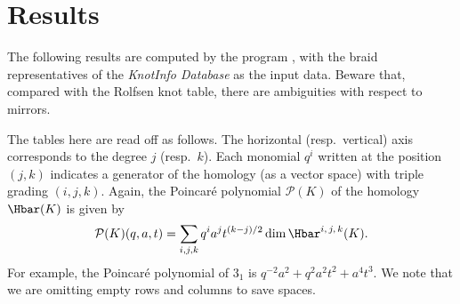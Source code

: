 
\appendix
\section{Results}\label{sec:results}

The following results are computed by the program \cite{kr-calc}, with the braid representatives of the \textit{KnotInfo Database} \cite{knotinfo} as the input data. Beware that, compared with the Rolfsen knot table, there are ambiguities with respect to mirrors.

The tables here are read off as follows. The horizontal (resp.\ vertical) axis corresponds to the degree $j$ (resp.\ $k$). Each monomial $q^i$ written at the position $(j,k)$ indicates a generator of the homology (as a vector space) with triple grading $(i,j,k)$. Again, the Poincar\'e polynomial $\mathcal{P}(K)$ of the homology $\Hbar(K)$ is given by
\[
    \mathcal{P}(K)(q, a, t) = \sum_{i,j,k} q^ia^jt^{(k-j)/2}\dim \Hbar^{i,\,j,\,k}(K).
\]
For example, the Poincar\'e polynomial of $3_1$ is $q^{-2}a^2+q^2a^2t^2+a^4t^3$.
We note that we are omitting empty rows and columns to save spaces.

\vspace{3em}

\begin{multicols}{2}
    \setlength\parindent{0pt}
    
    
    
    \newpage
    \small
    \setlength{\tabcolsep}{4pt}
    
\end{multicols}


\begin{multicols}{2}
    \setlength\parindent{0pt}
    \small
    \setlength{\tabcolsep}{4pt}
    
\end{multicols}